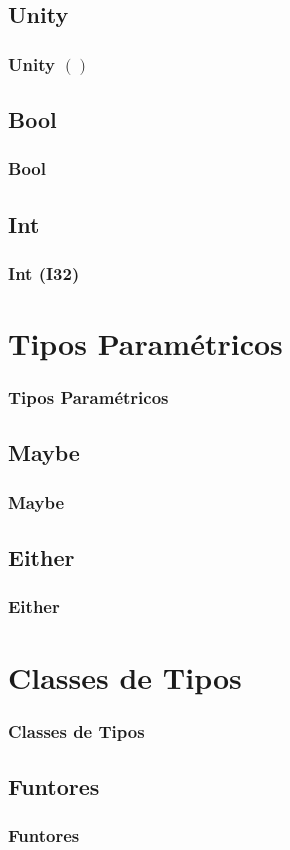 \documentclass{beamer}
\begin{document}
\subsection{Unity}
\begin{frame}
    \frametitle{Unity \(()\)}
\end{frame}

\subsection{Bool}
\begin{frame}
    \frametitle{Bool}
\end{frame}

\subsection{Int}
\begin{frame}
    \frametitle{Int (I32)}
\end{frame}

\section{Tipos Paramétricos}
\begin{frame}
    \frametitle{Tipos Paramétricos}
\end{frame}

\subsection{Maybe}
\begin{frame}
    \frametitle{Maybe}
\end{frame}

\subsection{Either}
\begin{frame}
    \frametitle{Either}
\end{frame}

\section{Classes de Tipos}
\begin{frame}
    \frametitle{Classes de Tipos}
\end{frame}

\subsection{Funtores}
\begin{frame}
    \frametitle{Funtores}
\end{frame}
\end{document}
